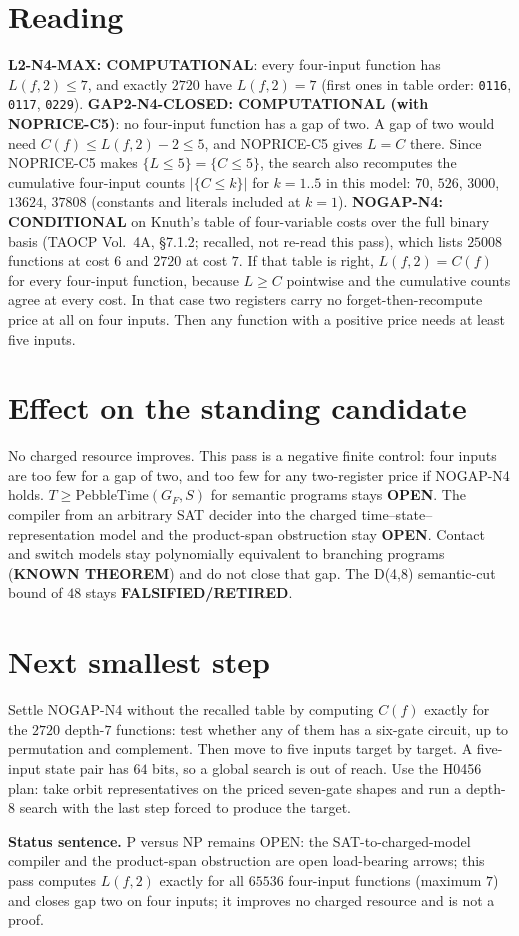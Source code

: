 \documentclass[11pt]{article}
\begin{document}
\section*{Reading}
\textbf{L2-N4-MAX: COMPUTATIONAL}: every four-input function has $L(f,2)\le7$, and exactly $2720$ have $L(f,2)=7$ (first ones in table order: \texttt{0116}, \texttt{0117}, \texttt{0229}).
\textbf{GAP2-N4-CLOSED: COMPUTATIONAL (with NOPRICE-C5)}: no four-input function has a gap of two. A gap of two would need $C(f)\le L(f,2)-2\le5$, and NOPRICE-C5 gives $L=C$ there.
Since NOPRICE-C5 makes $\{L\le5\}=\{C\le5\}$, the search also recomputes the cumulative four-input counts $|\{C\le k\}|$ for $k=1..5$ in this model: $70$, $526$, $3000$, $13624$, $37808$ (constants and literals included at $k=1$).
\textbf{NOGAP-N4: CONDITIONAL} on Knuth's table of four-variable costs over the full binary basis (TAOCP Vol.~4A, \S7.1.2; recalled, not re-read this pass), which lists $25008$ functions at cost $6$ and $2720$ at cost $7$. If that table is right, $L(f,2)=C(f)$ for every four-input function, because $L\ge C$ pointwise and the cumulative counts agree at every cost. In that case two registers carry no forget-then-recompute price at all on four inputs. Then any function with a positive price needs at least five inputs.

\section*{Effect on the standing candidate}
No charged resource improves. This pass is a negative finite control: four inputs are too few for a gap of two, and too few for any two-register price if NOGAP-N4 holds. $T\ge\mathrm{PebbleTime}(G_F,S)$ for semantic programs stays \textbf{OPEN}. The compiler from an arbitrary SAT decider into the charged time--state--representation model and the product-span obstruction stay \textbf{OPEN}. Contact and switch models stay polynomially equivalent to branching programs (\textbf{KNOWN THEOREM}) and do not close that gap. The D(4,8) semantic-cut bound of $48$ stays \textbf{FALSIFIED/RETIRED}.

\section*{Next smallest step}
Settle NOGAP-N4 without the recalled table by computing $C(f)$ exactly for the $2720$ depth-$7$ functions: test whether any of them has a six-gate circuit, up to permutation and complement. Then move to five inputs target by target. A five-input state pair has $64$ bits, so a global search is out of reach. Use the H0456 plan: take orbit representatives on the priced seven-gate shapes and run a depth-$8$ search with the last step forced to produce the target.

\bigskip
\noindent\textbf{Status sentence.} P versus NP remains OPEN: the SAT-to-charged-model compiler and the product-span obstruction are open load-bearing arrows; this pass computes $L(f,2)$ exactly for all $65536$ four-input functions (maximum $7$) and closes gap two on four inputs; it improves no charged resource and is not a proof.
\end{document}
